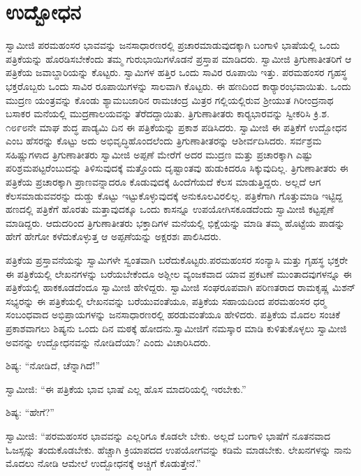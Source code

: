 
\chapter{ಉದ್ಬೋಧನ }

 ಸ್ವಾಮೀಜಿ ಪರಮಹಂಸರ ಭಾವವನ್ನು ಜನಸಾಧಾರಣರಲ್ಲಿ ಪ್ರಚಾರಮಾಡುವುದಕ್ಕಾಗಿ ಬಂಗಾಳಿ ಭಾಷೆಯಲ್ಲಿ ಒಂದು ಪತ್ರಿಕೆಯನ್ನು ಹೊರಡಿಸಬೇಕೆಂದು ತಮ್ಮ ಗುರುಭಾಯಿಗಳೊಡನೆ ಪ್ರಸ್ತಾಪ ಮಾಡಿದರು. ಸ್ವಾಮೀಜಿ ತ್ರಿಗುಣಾತೀತರಿಗೆ ಆ ಪತ್ರಿಕೆಯ ಜವಾಬ್ದಾರಿಯನ್ನು ಕೊಟ್ಟರು. ಸ್ವಾಮಿಗಳ ಹತ್ತಿರ ಒಂದು ಸಾವಿರ ರೂಪಾಯಿ ಇತ್ತು. ಪರಮಹಂಸರ ಗೃಹಸ್ಥ ಭಕ್ತರೊಬ್ಬರು ಒಂದು ಸಾವಿರ ರೂಪಾಯಿಗಳನ್ನು ಸಾಲವಾಗಿ ಕೊಟ್ಟರು. ಈ ಹಣದಿಂದ ಕಾರ‍್ಯಾರಂಭವಾಯಿತು. ಒಂದು ಮುದ್ರಣ ಯಂತ್ರವನ್ನು ಕೊಂಡು ಶ್ಯಾಮಬಜಾರಿನ ರಾಮಚಂದ್ರ ಮಿತ್ರರ ಗಲ್ಲಿಯಲ್ಲಿರುವ ಶ‍್ರೀಯುತ ಗಿರೀಂದ್ರನಾಥ ಬಸಾಕರ ಮನೆಯಲ್ಲಿ ಮುದ್ರಣಾಲಯವನ್ನು ತೆರೆದದ್ದಾಯಿತು. ತ್ರಿಗುಣಾತೀತರು ಕಾರ‍್ಯಭಾರವನ್ನು ಸ್ವೀಕರಿಸಿ ಕ್ರಿ.ಶ. ೧೮೯೮ನೇ ಮಾಘ ಶುದ್ಧ ಪಾಡ್ಯಮಿ ದಿನ ಈ ಪತ್ರಿಕೆಯನ್ನು ಪ್ರಕಾಶ ಪಡಿಸಿದರು. ಸ್ವಾಮೀಜಿ ಈ ಪತ್ರಿಕೆಗೆ ಉದ್ಬೋಧನ ಎಂಬ ಹೆಸರನ್ನು ಕೊಟ್ಟು ಅದು ಅಭಿವೃದ್ಧಿಹೊಂದಲೆಂದು ತ್ರಿಗುಣಾತೀತರನ್ನು ಆಶೀರ್ವದಿಸಿದರು. ಸರ್ವಶ್ರಮ ಸಹಿಷ್ಣುಗಳಾದ ತ್ರಿಗುಣಾತೀತರು ಸ್ವಾಮೀಜಿ ಅಪ್ಪಣೆ ಮೇರೆಗೆ ಅದರ ಮುದ್ರಣ ಮತ್ತು ಪ್ರಚಾರಕ್ಕಾಗಿ ಎಷ್ಟು ಪರಿಶ್ರಮಪಟ್ಟರೆಂಬುದನ್ನು ತಿಳಿಸುವುದಕ್ಕೆ ಮತ್ತೊಂದು ದೃಷ್ಟಾಂತವು ಹುಡುಕಿದರೂ ಸಿಕ್ಕುವುದಿಲ್ಲ. ತ್ರಿಗುಣಾತೀತರು ಈ ಪತ್ರಿಕೆಯ ಪ್ರಚಾರಕ್ಕಾಗಿ ಪ್ರಾಣವನ್ನಾದರೂ ಕೊಡುವುದಕ್ಕೆ ಹಿಂದೆಗೆಯದೆ ಕೆಲಸ ಮಾಡುತ್ತಿದ್ದರು. ಅಲ್ಲದೆ ಆಗ ಕೆಲಸಮಾಡುವವರನ್ನು ದುಡ್ಡು ಕೊಟ್ಟು ಇಟ್ಟುಕೊಳ್ಳುವುದಕ್ಕೆ ಅನುಕೂಲವಿರಲಿಲ್ಲ. ಪತ್ರಿಕೆಗಾಗಿ ಗೊತ್ತುಮಾಡಿ ಇಟ್ಟಿದ್ದ ಹಣದಲ್ಲಿ ಪತ್ರಿಕೆಗೆ ಹೊರತು ಮತ್ತಾವುದಕ್ಕೂ ಒಂದು ಕಾಸನ್ನೂ ಉಪಯೋಗಿಸಕೂಡದೆಂದು ಸ್ವಾಮೀಜಿ ಕಟ್ಟಪ್ಪಣೆ ಮಾಡಿದ್ದರು. ಆದುದರಿಂದ ತ್ರಿಗುಣಾತೀತರು ಭಕ್ತಾದಿಗಳ ಮನೆಯಲ್ಲಿ ಭಿಕ್ಷೆಯನ್ನು ಮಾಡಿ ತಮ್ಮ ಹೊಟ್ಟೆಯ ಪಾಡನ್ನು ಹೇಗೆ ಹೇಗೋ ಕಳೆದುಕೊಳ್ಳುತ್ತ ಆ ಅಪ್ಪಣೆಯನ್ನು ಅಕ್ಷರಶಃ ಪಾಲಿಸಿದರು. 

 ಪತ್ರಿಕೆಯ ಪ್ರಸ್ತಾವನೆಯನ್ನು ಸ್ವಾಮಿಗಳೇ ಸ್ವಂತವಾಗಿ ಬರೆದುಕೊಟ್ಟರು.\break ಪರಮಹಂಸರ ಸಂನ್ಯಾಸಿ ಮತ್ತು ಗೃಹಸ್ಥ ಭಕ್ತರೇ ಈ ಪತ್ರಿಕೆಯಲ್ಲಿ ಲೇಖನಗಳನ್ನು ಬರೆಯಬೇಕೆಂದೂ ಅಶ್ಲೀಲ ವ್ಯಂಜಕವಾದ ಯಾವ ಪ್ರಕಟಣೆ ಮುಂತಾದವುಗಳನ್ನೂ ಈ ಪತ್ರಿಕೆಯಲ್ಲಿ ಹಾಕಕೂಡದೆಂದೂ ಸ್ವಾಮೀಜಿ ಹೇಳಿದ್ದರು. ಸ್ವಾಮೀಜಿ ಸಂಘರೂಪವಾಗಿ ಪರಿಣತರಾದ ರಾಮಕೃಷ್ಣ ಮಿಶನ್ ಸಭ್ಯರನ್ನು ಈ ಪತ್ರಿಕೆಯಲ್ಲಿ ಲೇಖನವನ್ನು ಬರೆಯುವಂತೆಯೂ, ಪತ್ರಿಕೆಯ ಸಹಾಯದಿಂದ ಪರಮಹಂಸರ ಧರ‍್ಮ ಸಂಬಂಧವಾದ ಅಭಿಪ್ರಾಯಗಳನ್ನು ಜನಸಾಧಾರಣರಲ್ಲಿ ಹರಡುವಂತೆಯೂ ಹೇಳಿದರು. ಪತ್ರಿಕೆಯ ಮೊದಲ ಸಂಚಿಕೆ ಪ್ರಕಾಶವಾಗಲು ಶಿಷ್ಯನು ಒಂದು ದಿನ ಮಠಕ್ಕೆ ಹೋದನು.\break ಸ್ವಾಮೀಜಿಗೆ ನಮಸ್ಕಾರ ಮಾಡಿ ಕುಳಿತುಕೊಳ್ಳಲು ಸ್ವಾಮೀಜಿ ಅವನನ್ನು ಉದ್ಬೋಧನವನ್ನು ನೋಡಿದೆಯಾ? ಎಂದು ವಿಚಾರಿಸಿದರು. 

 ಶಿಷ್ಯ: “ನೋಡಿದೆ, ಚೆನ್ನಾಗಿದೆ!” 

 ಸ್ವಾಮೀಜಿ: “ಈ‌ ಪತ್ರಿಕೆಯ ಭಾವ ಭಾಷೆ ಎಲ್ಲ ಹೊಸ ಮಾದರಿಯಲ್ಲಿ ಇರಬೇಕು.” 

 ಶಿಷ್ಯ: “ಹೇಗೆ?” 

 ಸ್ವಾಮೀಜಿ: “ಪರಮಹಂಸರ ಭಾವವನ್ನು ಎಲ್ಲರಿಗೂ ಕೊಡಲೇ ಬೇಕು. ಅಲ್ಲದೆ ಬಂಗಾಳಿ ಭಾಷೆಗೆ ನೂತನವಾದ ಓಜಸ್ಸನ್ನು ತಂದುಕೊಡಬೇಕು. ಹೆಚ್ಚಾಗಿ ಕ್ರಿಯಾಪದದ ಉಪಯೋಗವನ್ನು ಕಡಿಮೆ ಮಾಡಬೇಕು. ಲೇಖನಗಳನ್ನು ನಾನು ಮೊದಲು ನೋಡಿ ಆಮೇಲೆ ಉದ್ಬೋಧನಕ್ಕೆ ಅಚ್ಚಿಗೆ ಕೊಡುತ್ತೇನೆ.” 

